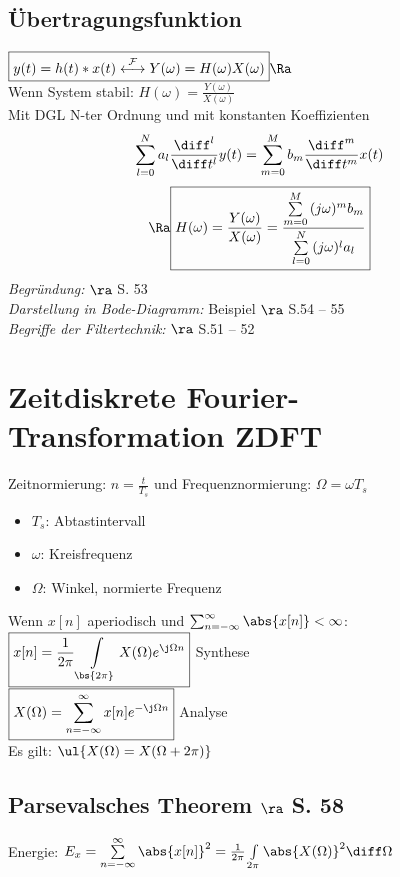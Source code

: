 \documentclass[6pt,a4paper]{scrartcl}
\begin{document}
\begin{multicols}{4}
	\subsection*{Übertragungsfunktion}
	$\boxed{y(t) = h(t) \ast x(t) \stackrel{\mathcal{F}}{\longleftrightarrow} Y(\omega) = H(\omega) X(\omega)} \Ra$\\
	Wenn System stabil:	$\boxed{H(\omega) = \frac{Y(\omega)}{X(\omega)}}$\\
	Mit DGL N-ter Ordnung und mit konstanten Koeffizienten
	\[\sum\limits_{l = 0}^{N}{a_l \frac{\diff^l}{\diff t^l} y(t)} = \sum\limits_{m = 0}^{M}{b_m \frac{\diff^m}{\diff t^m} x(t)}\]
	\[\Ra \boxed{H(\omega) = \frac{Y(\omega)}{X(\omega)} = \frac{\sum\limits_{m = 0}^{M}{(j\omega)^m b_m}}{\sum\limits_{l = 0}^{N}{(j\omega)^l a_l}}}\]
	\emph{Begründung:} $\ra$ S. 53\\
	\emph{Darstellung in Bode-Diagramm:} Beispiel $\ra$ S.54 -- 55\\
	\emph{Begriffe der Filtertechnik:} $\ra$ S.51 -- 52
	
\section{Zeitdiskrete Fourier-Transformation ZDFT}
Zeitnormierung: $n = \frac{t}{T_s}$ und Frequenznormierung: $\Omega = \omega T_s$
\begin{itemize}
	\item $T_s$: Abtastintervall
	\item $\omega$: Kreisfrequenz
	\item $\Omega$: Winkel, normierte Frequenz
\end{itemize}
Wenn $x[n]$ aperiodisch und $\sum_{n = -\infty}^{\infty}{\abs{x[n]}} < \infty$:\\
$\boxed{x[n] = \frac{1}{2 \pi}\int\limits_{\bs{2 \pi}}{X(\Omega) e^{\j \Omega n}}}$ \hfill Synthese\\
$\boxed{X(\Omega) = \sum\limits_{n = -\infty}^{\infty}{x[n] e^{-\j \Omega n}}}$ \hfill Analyse\\
Es gilt: $\ul{X(\Omega) = X(\Omega + 2 \pi)}$

	\subsection*{Parsevalsches Theorem $\ra$ S. 58}
	Energie: $E_x = \sum\limits_{n = -\infty}^{\infty}{\abs{x[n]}^2} = \frac{1}{2 \pi}\int\limits_{2 \pi}{\abs{X(\Omega)}^2 \diff \Omega}$
	

\end{multicols}
\end{document}

